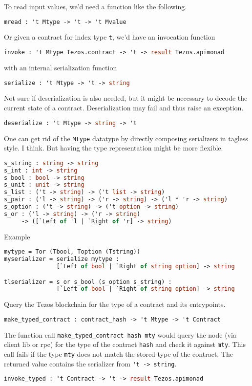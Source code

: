 \documentclass{article}
\begin{document}
To read input values, we'd need a function like the following.
\begin{lstlisting}[language=Caml]
mread : 't Mtype -> 't -> 't Mvalue
\end{lstlisting}

Or given a contract for index type \lstinline/t/, we'd have an
invocation function
\begin{lstlisting}[language=Caml]
invoke : 't Mtype Tezos.contract -> 't -> result Tezos.apimonad
\end{lstlisting}
with an internal serialization function
\begin{lstlisting}[language=Caml]
serialize : 't Mtype -> 't -> string
\end{lstlisting}
Not sure if deserialization is also needed, but it might be necessary
to decode the current state of a contract. Deserialization may fail
and thus raise an exception.
\begin{lstlisting}[language=Caml]
deserialize : 't Mtype -> string -> 't
\end{lstlisting}

One can get rid of the \lstinline/Mtype/ datatype by directly
composing serializers in tagless style. I think. But having the type
representation might be more flexible.
\begin{lstlisting}[language=Caml]
s_string : string -> string
s_int : int -> string
s_bool : bool -> string
s_unit : unit -> string
s_list : ('t -> string) -> ('t list -> string)
s_pair : ('l -> string) -> ('r -> string) -> ('l * 'r -> string)
s_option : ('t -> string) -> ('t option -> string)
s_or : ('l -> string) -> ('r -> string) 
     -> ([`Left of 'l | `Right of 'r] -> string)
\end{lstlisting}

Example
\begin{lstlisting}[language=Caml]
mytype = Tor (Tbool, Toption (Tstring))
myserializer = serialize mytype : 
               [`Left of bool | `Right of string option] -> string

tlserializer = s_or s_bool (s_option s_string) :
               [`Left of bool | `Right of string option] -> string
\end{lstlisting}

Query the Tezos blockchain for the type of a contract and its
entrypoints.
\begin{lstlisting}[language=Caml]
make_typed_contract : contract_hash -> 't Mtype -> 't Contract
\end{lstlisting}
The function call \lstinline/make_typed_contract hash mty/ would query
the node (via client lib or rpc) for the type of the contract
\lstinline/hash/ and check it against \lstinline/mty/.
This call fails if the type \lstinline/mty/ does not match the
stored type of the contract.
The returned value contains the serializer from \lstinline/'t -> string/.
\begin{lstlisting}[language=Caml]
invoke_typed : 't Contract -> 't -> result Tezos.apimonad
\end{lstlisting}
\end{document}
